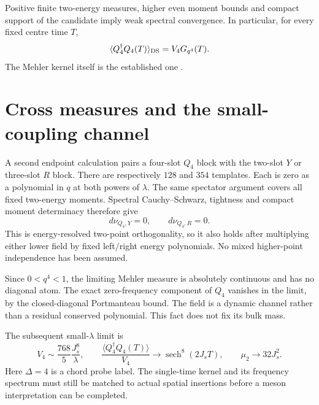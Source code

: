 \documentclass[11pt,a4paper]{article}
\newcommand{\av}[1]{\langle #1\rangle}
\begin{document}
Positive finite two-energy measures, higher even moment bounds and
compact support of the candidate imply weak spectral convergence.
In particular, for every fixed centre time $T$,
\begin{equation}\label{eq:kernel}
 \av{Q_4^\dagger Q_4(T)}_{\rm DS}=V_4G_{q^4}(T).
\end{equation}
The Mehler kernel itself is the established one \cite{BNR}.

\newpage
\section{Cross measures and the small-coupling channel}
A second endpoint calculation pairs a four-slot $Q_4$ block with
the two-slot $Y$ or three-slot $R$ block. There are respectively
$128$ and $354$ templates. Each is zero as a polynomial in $q$ at
both powers of $\lambda$. The same spectator argument covers all
fixed two-energy moments. Spectral Cauchy--Schwarz, tightness and
compact moment determinacy therefore give
\begin{equation}
 d\nu_{Q_4,Y}=0,\qquad d\nu_{Q_4,R}=0.
\end{equation}
This is energy-resolved two-point orthogonality, so it also holds
after multiplying either lower field by fixed left/right energy
polynomials. No mixed higher-point independence has been assumed.

Since $0<q^4<1$, the limiting Mehler measure is absolutely continuous
and has no diagonal atom. The exact zero-frequency component of
$Q_4$ vanishes in the limit, by the closed-diagonal Portmanteau bound.
The field is a dynamic channel rather than a residual conserved
polynomial. This fact does not fix its bulk mass.

The subsequent small-$\lambda$ limit is
\begin{equation}
 V_4\sim\frac{768}{5}\frac{J_s^8}{\lambda},\qquad
 \frac{\av{Q_4^\dagger Q_4(T)}}{V_4}
 \longrightarrow\operatorname{sech}^8(2J_sT),\qquad
 \mu_2\longrightarrow32J_s^2.
\end{equation}
Here $\Delta=4$ is a chord probe label. The single-time kernel and
its frequency spectrum must still be matched to actual spatial
insertions before a meson interpretation can be completed.
\end{document}
